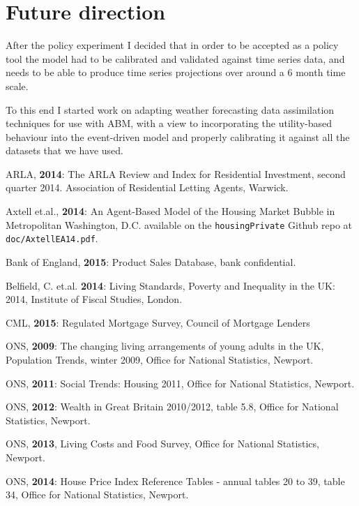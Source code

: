 \documentclass{report}
\begin{document}
\section{Future direction}

After the policy experiment I decided that in order to be accepted as a policy tool the model had to be calibrated and validated against time series data, and needs to be able to produce time series projections over around a 6 month time scale.

To this end I started work on adapting weather forecasting data assimilation techniques for use with ABM, with a view to incorporating the utility-based behaviour into the event-driven model and properly calibrating it against all the datasets that we have used.

\appendix
\begin{thebibliography}{20}

 ARLA, \textbf{2014}: The ARLA Review and Index for Residential Investment, second quarter 2014. Association of Residential Letting Agents, Warwick.

 Axtell et.al., \textbf{2014}: An Agent-Based Model of the Housing Market Bubble in Metropolitan Washington, D.C. available on the \texttt{housingPrivate} Github repo at \texttt{doc/AxtellEA14.pdf}.

 Bank of England, \textbf{2015}: Product Sales Database, bank confidential.

 Belfield, C. et.al. \textbf{2014}: Living Standards, Poverty and Inequality in the UK: 2014, Institute of Fiscal Studies, London.

 CML, \textbf{2015}: Regulated Mortgage Survey, Council of Mortgage Lenders

 ONS, \textbf{2009}: The changing living arrangements of young adults in the UK, Population Trends, winter 2009, Office for National Statistics, Newport.

 ONS, \textbf{2011}: Social Trends: Housing 2011, Office for National Statistics, Newport.

 ONS, \textbf{2012}: Wealth in Great Britain 2010/2012, table 5.8, Office for National Statistics, Newport.

 ONS, \textbf{2013}, Living Costs and Food Survey, Office for National Statistics, Newport.

 ONS, \textbf{2014}: House Price Index Reference Tables - annual tables 20 to 39, table 34, Office for National Statistics, Newport.

\end{thebibliography}
\end{document}
